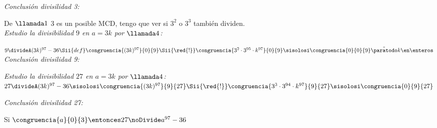 \textit{Conclusión divisilidad 3: }\par
{}

De $\llamada1$ 3 es un posible MCD, tengo que ver si $3^2$ o $3^3$ también dividen.\\

\textit{Estudio la divisibilidad $9$ en $a = 3k$ por $\llamada4$:}\par
$ 9 \divideA (3k)^{97} - 36
    \Sii{def}
    \congruencia{(3k)^{97}}{0}{9}
    \Sii{\red{!}}
    \congruencia{3^2 \cdot 3^{95}\cdot k^{97}}{0}{9}
    \sisolosi
	\congruencia{0}{0}{9}\Tilde \paratodo k \en \enteros 
$\\

\textit{Conclusión divisilidad 9: }\\
\Tilde


\textit{Estudio la divisibilidad $27$ en $a = 3k$ por $\llamada4$:}\\
$ 27 \divideA (3k)^{97} - 36
	\sisolosi
    \congruencia{(3k)^{97}}{9}{27}
    \Sii{\red{!}}
    \congruencia{3^3 \cdot 3^{94} \cdot k^{97}}{9}{27}
    \sisolosi
    \congruencia{0}{9}{27} 
$

\textit{Conclusión divisilidad 27: }

Si $\congruencia{a}{0}{3} \entonces 27 \noDivide a^{97} - 36$


\begin{aportes}
  \item {}
	\item {}
\end{aportes}
